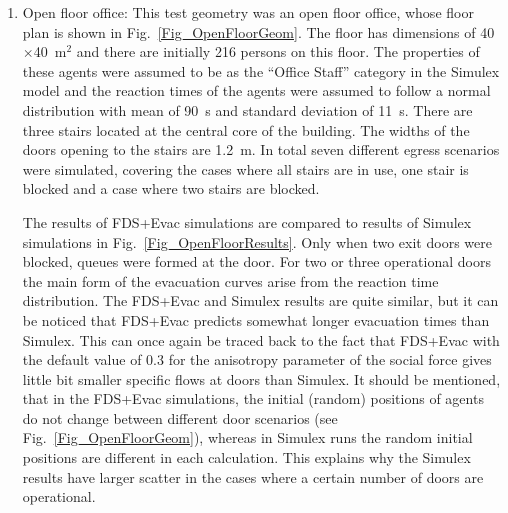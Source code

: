 \documentclass[12pt,a4paper,final,twoside]{stylevk}
\begin{document}
\begin{enumerate}
\item Open floor office: This test geometry was an open floor office,
  whose floor plan is shown in Fig.~\ref{Fig_OpenFloorGeom}.  The
  floor has dimensions of 40$\times$40~$\mathrm{m^2}$ and there are
  initially 216 persons on this floor.  The properties of these agents
  were assumed to be as the ``Office Staff'' category in the Simulex
  model and the reaction times of the agents were assumed to follow a
  normal distribution with mean of 90~s and standard deviation of
  11~s.  There are three stairs located at the central core of the
  building.  The widths of the doors opening to the stairs are 1.2~m.
  In total seven different egress scenarios were simulated, covering
  the cases where all stairs are in use, one stair is blocked and a
  case where two stairs are blocked.
  
  The results of FDS+Evac simulations are compared to results of
  Simulex simulations in Fig.~\ref{Fig_OpenFloorResults}.  Only when
  two exit doors were blocked, queues were formed at the door.  For
  two or three operational doors the main form of the evacuation
  curves arise from the reaction time distribution.  The FDS+Evac and
  Simulex results are quite similar, but it can be noticed that
  FDS+Evac predicts somewhat longer evacuation times than Simulex.
  This can once again be traced back to the fact that FDS+Evac with
  the default value of 0.3 for the anisotropy parameter of the social
  force gives little bit smaller specific flows at doors than Simulex.
  It should be mentioned, that in the FDS+Evac simulations, the
  initial (random) positions of agents do not change between different
  door scenarios (see Fig.~\ref{Fig_OpenFloorGeom}), whereas in
  Simulex runs the random initial positions are different in each
  calculation.  This explains why the Simulex results have larger
  scatter in the cases where a certain number of doors are
  operational.\vspace{\fill}



\end{enumerate}
\end{document}

